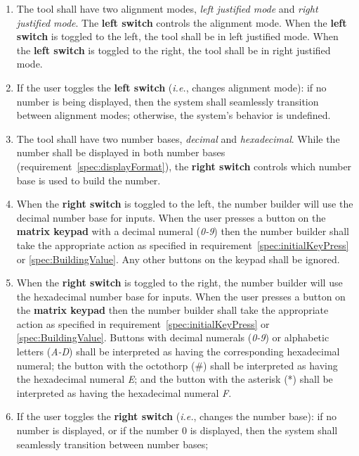 \begin{enumerate}
    \item The tool shall have two alignment modes, \textit{left justified mode} and \textit{right justified mode}. The \textbf{left switch} controls the alignment mode.
        When the \textbf{left switch} is toggled to the left, the tool shall be in left justified mode.
        When the \textbf{left switch} is toggled to the right, the tool shall be in right justified mode.
    \item If the user toggles the \textbf{left switch} (\textit{i.e.}, changes alignment mode):
        if no number is being displayed, then the system shall seamlessly transition between alignment modes;
        otherwise, the system's behavior is undefined.
    \item The tool shall have two number bases, \textit{decimal} and \textit{hexadecimal}.
        While the number shall be displayed in both number bases (requirement~\ref{spec:displayFormat}),
        the \textbf{right switch} controls which number base is used to build the number.
    \item \label{spec:decimalExplained} When the \textbf{right switch} is toggled to the left, the number builder will use the decimal number base for inputs.
        When the user presses a button on the \textbf{matrix keypad} with a decimal numeral (\textit{0-9}) then the number builder shall take the appropriate action as specified in requirement~\ref{spec:initialKeyPress} or \ref{spec:BuildingValue}.
        Any other buttons on the keypad shall be ignored.
    \item \label{spec:hexadecimalExplained} When the \textbf{right switch} is toggled to the right, the number builder will use the hexadecimal number base for inputs.
        When the user presses a button on the \textbf{matrix keypad} then the number builder shall take the appropriate action as specified in requirement~\ref{spec:initialKeyPress} or \ref{spec:BuildingValue}.
        Buttons with decimal numerals (\textit{0-9}) or alphabetic letters (\textit{A-D}) shall be interpreted as having the corresponding hexadecimal numeral;
        the button with the octothorp (\#) shall be interpreted as having the hexadecimal numeral \textit{E};
        and the button with the asterisk (*) shall be interpreted as having the hexadecimal numeral \textit{F}.
    \item If the user toggles the \textbf{right switch} (\textit{i.e.}, changes the number base):
        if no number is displayed, or if the number 0 is displayed, then the system shall seamlessly transition between number bases;

\end{enumerate}
